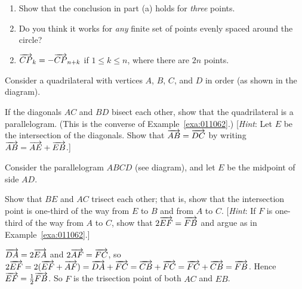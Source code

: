 \begin{multicols}{2}
\begin{ex}
\begin{enumerate}[label={\alph*.}]
\item Show that the conclusion in part (a) holds for \textit{three} points.

\item Do you think it works for \textit{any} finite set of points evenly spaced around the circle?

\end{enumerate}
\begin{sol}
\begin{enumerate}[label={\alph*.}]
\setcounter{enumi}{1}
\item  $\overrightarrow{CP}_{k} = -\overrightarrow{CP}_{n+k}$
 if $1 \leq k \leq n$, where there are $2n$ points.

\end{enumerate}
\end{sol}
\end{ex}

\columnbreak
\begin{ex}
Consider a quadrilateral with vertices $A$, $B$, $C$, and $D$ in order (as shown in the diagram).


\begin{figure}[H]
\centering

\end{figure}

If the diagonals $AC$ and $BD$ bisect each other, show that the quadrilateral is a parallelogram. (This is the converse of Example~\ref{exa:011062}.) [\textit{Hint}: Let $E$ be the intersection of the diagonals. Show that $\overrightarrow{AB} = \overrightarrow{DC}$ by writing $\overrightarrow{AB} = \overrightarrow{AE} + \overrightarrow{EB}$.]
\end{ex}

\begin{ex}
Consider the parallelogram $ABCD$ (see diagram), and let $E$ be the midpoint of side $AD$.


\begin{figure}[H]
\centering

\end{figure}

Show that $BE$ and $AC$ trisect each other; that is, show that the intersection point is one-third of the way from $E$ to $B$ and from $A$ to $C$. [\textit{Hint}: If $F$ is one-third of the way from $A$ to $C$, show that $2\overrightarrow{EF} = \overrightarrow{FB}$ and argue as in Example~\ref{exa:011062}.]

\begin{sol} 
$\overrightarrow{DA} = 2\overrightarrow{EA}$ and $2\overrightarrow{AF} = \overrightarrow{FC}$, so $2\overrightarrow{EF} = 2(\overrightarrow{EF} + \overrightarrow{AF}) = \overrightarrow{DA} + \overrightarrow{FC} = \overrightarrow{CB} + \overrightarrow{FC} = \overrightarrow{FC} + \overrightarrow{CB} = \overrightarrow{FB}$. Hence $\overrightarrow{EF} = \tfrac{1}{2}\overrightarrow{FB}$. So $F$ is the trisection point of both $AC$ and $EB$.
\end{sol}
\end{ex}


\end{multicols}
